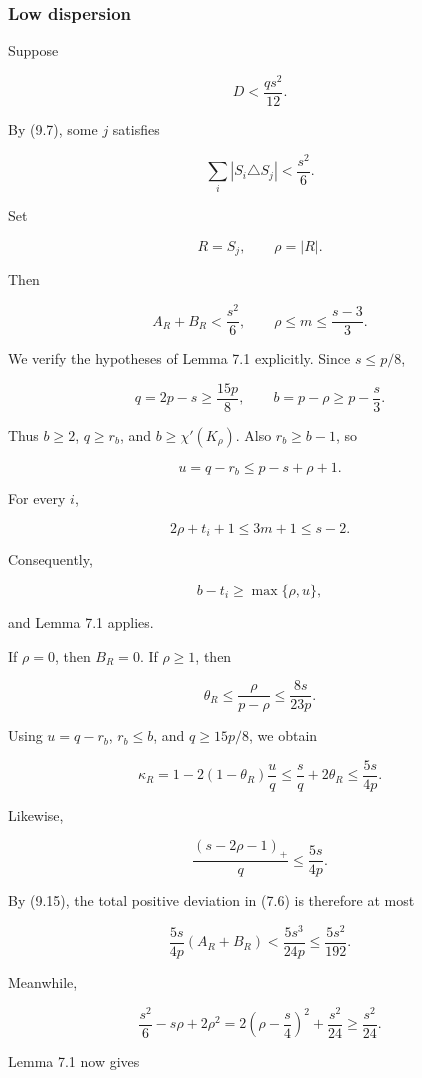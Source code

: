 \documentclass[
  american,
  11pt,
  a4paper,
]{article}
\begin{document}
\subsubsection{Low dispersion}\label{low-dispersion}

Suppose

\[
D<\frac{qs^2}{12}.
\tag{9.13}
\]

By (9.7), some \(j\) satisfies

\[
\sum_i|S_i\triangle S_j|
<
\frac{s^2}{6}.
\tag{9.14}
\]

Set

\[
R=S_j,
\qquad
\rho=|R|.
\]

Then

\[
A_R+B_R<\frac{s^2}{6},
\qquad
\rho\le m\le\frac{s-3}{3}.
\tag{9.15}
\]

We verify the hypotheses of Lemma 7.1 explicitly. Since \(s\le p/8\),

\[
q=2p-s\ge\frac{15p}{8},
\qquad
b=p-\rho\ge p-\frac s3.
\]

Thus \(b\ge2\), \(q\ge r_b\), and \(b\ge\chi'(K_\rho)\). Also \(r_b\ge b-1\), so

\[
u=q-r_b\le p-s+\rho+1.
\]

For every \(i\),

\[
2\rho+t_i+1
\le
3m+1
\le
s-2.
\]

Consequently,

\[
b-t_i\ge\max\{\rho,u\},
\]

and Lemma 7.1 applies.

If \(\rho=0\), then \(B_R=0\). If \(\rho\ge1\), then

\[
\theta_R
\le
\frac{\rho}{p-\rho}
\le
\frac{8s}{23p}.
\]

Using \(u=q-r_b\), \(r_b\le b\), and \(q\ge15p/8\), we obtain

\[
\kappa_R
=1-2(1-\theta_R)\frac uq
\le
\frac sq+2\theta_R
\le
\frac{5s}{4p}.
\tag{9.16}
\]

Likewise,

\[
\frac{(s-2\rho-1)_+}{q}
\le
\frac{5s}{4p}.
\tag{9.17}
\]

By (9.15), the total positive deviation in (7.6) is therefore at most

\[
\frac{5s}{4p}(A_R+B_R)
<
\frac{5s^3}{24p}
\le
\frac{5s^2}{192}.
\tag{9.18}
\]

Meanwhile,

\[
\frac{s^2}{6}-s\rho+2\rho^2
=
2\left(\rho-\frac s4\right)^2+\frac{s^2}{24}
\ge
\frac{s^2}{24}.
\tag{9.19}
\]

Lemma 7.1 now gives
\end{document}

